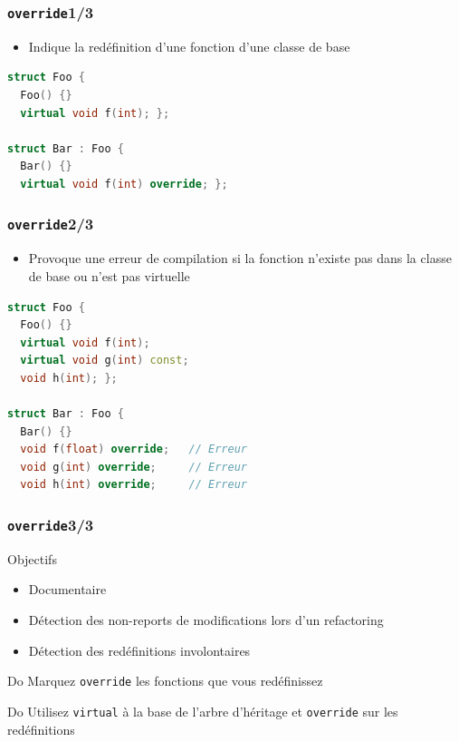\documentclass[C++.tex]{subfiles}
\begin{document}
\begin{frame}[fragile]
	\frametitle{\lstinline|override|\titlehfill{}1/3}
	\begin{itemize}
		\item Indique la redéfinition d'une fonction d'une classe de base
	\end{itemize}

	\begin{lstlisting}[language=C++]
struct Foo {
  Foo() {}
  virtual void f(int); };

struct Bar : Foo {
  Bar() {}
  virtual void f(int) override; };
\end{lstlisting}
\end{frame}

\begin{frame}[fragile]
	\frametitle{\lstinline|override|\titlehfill{}2/3}
	\begin{itemize}
		\item Provoque une erreur de compilation si la fonction n'existe pas dans la classe de base ou n'est pas virtuelle
	\end{itemize}

	\begin{lstlisting}[language=C++]
struct Foo {
  Foo() {}
  virtual void f(int); 
  virtual void g(int) const;
  void h(int); };

struct Bar : Foo {
  Bar() {}
  void f(float) override;   // Erreur 
  void g(int) override;     // Erreur
  void h(int) override;     // Erreur\end{lstlisting}
\end{frame}

\begin{frame}[fragile]
	\frametitle{\lstinline|override|\titlehfill{}3/3}
	\begin{block}{Objectifs}
		\begin{itemize}
			\item Documentaire
			\item Détection des non-reports de modifications lors d'un refactoring
			\item Détection des redéfinitions involontaires
		\end{itemize}
	\end{block}

	\begin{exampleblock}{Do}
		Marquez \lstinline|override| les fonctions que vous redéfinissez
	\end{exampleblock}

	\begin{exampleblock}{Do}
		Utilisez \lstinline|virtual| à la base de l'arbre d'héritage et \lstinline|override| sur les redéfinitions

	\end{exampleblock}
\end{frame}
\end{document}
